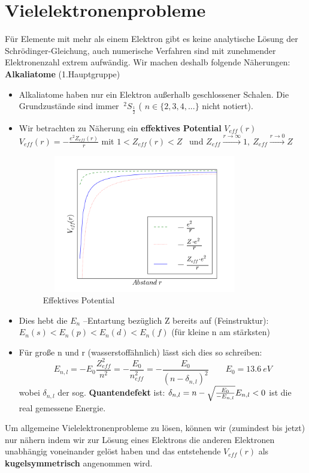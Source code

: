 \documentclass[Ex4_Zusammenfassung.tex]{subfiles}
\begin{document}
\section{Vielelektronenprobleme} 
Für Elemente mit mehr als einem Elektron gibt es keine analytische Lösung der Schrödinger-Gleichung, auch numerische Verfahren sind mit zunehmender Elektronenzahl extrem aufwändig. Wir machen deshalb folgende Näherungen:
\textbf{Alkaliatome} (1.Hauptgruppe)
\begin{itemize}
\item Alkaliatome haben nur ein Elektron außerhalb geschlossener Schalen. Die Grundzustände sind immer $ \ ^{2}S_{\frac{1}{2}} $ ( $ n  \in \{2,3,4,...\} $ nicht notiert).
\item Wir betrachten zu Näherung ein \textbf{effektives Potential} $ V_{eff}(r) $ \newline \newline
 $ V_{eff}(r) = - \frac{e^2 Z_{eff}(r)}{r} $ mit $ 1 < Z_{eff}(r) < Z $ \  und  $ Z_ {eff} \stackrel{r\rightarrow \infty}{\rightarrow} 1, \ Z_{eff} \stackrel{r \rightarrow 0}{\rightarrow} Z $
 
\begin{figure}[h]
\centering
\includegraphics[height= 6cm, width=9cm]{effpot.png}
\caption{ Effektives Potential }
\end{figure}
 \item Dies hebt die $ E_n $ --Entartung bezüglich Z bereits auf (Feinstruktur): \newline
$ E_n(s) < E_n(p) < E_n(d) < E_n(f)$ (für kleine n am stärksten)
\item Für große n und r (wasserstoffähnlich) lässt sich dies so schreiben: 
	 \begin{equation}
 	E_{n,l} = -E_0 \frac{Z_{eff}^2}{n^2} = - \frac{E_0}{n_{eff}^2} = - \frac{E_0}{(n-\delta_{n,l})^2} \qquad E_0 = \SI{13.6}{eV}
 	\end{equation}
	wobei $\delta_{n,l} $ der sog. \textbf{Quantendefekt} ist: $ \delta_{n,l} = n - \sqrt{\frac{E_0}{-E_{n,l}}} \newline  E_{n,l} <  0  $ ist die real gemessene Energie. 

\end{itemize}
Um allgemeine Vielelektronenprobleme zu lösen, können wir (zumindest bis jetzt) nur nähern indem wir zur Lösung eines Elektrons die anderen Elektronen unabhängig voneinander gelöst haben und das entstehende $ V_{eff}(r) $ als \textbf{kugelsymmetrisch} angenommen wird.
\end{document}
